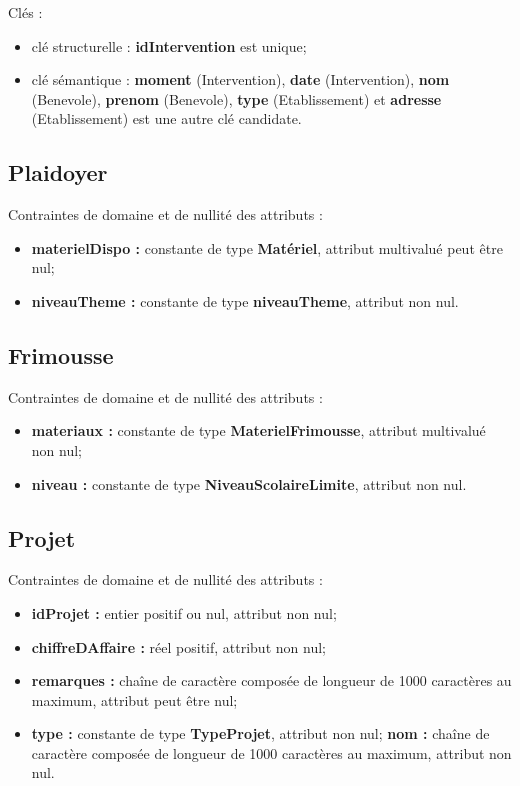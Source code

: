 \documentclass[asi, sansVersion]{picInsa}
\begin{document}
Clés : 
\begin{itemize}
\item clé structurelle : \textbf{idIntervention} est unique;
\item clé sémantique : \textbf{moment} (Intervention), \textbf{date} (Intervention), \textbf{nom} (Benevole), \textbf{prenom} (Benevole), \textbf{type} (Etablissement) et \textbf{adresse} (Etablissement) est une autre clé candidate. \\ 
\end{itemize}

\subsection*{Plaidoyer}
Contraintes de domaine et de nullité des attributs :
\begin{itemize}
	\item \textbf{materielDispo :} constante de type \textbf{Matériel}, attribut multivalué peut être nul; 
	\item \textbf{niveauTheme :} constante de type \textbf{niveauTheme}, attribut non nul.\\
\end{itemize}

\subsection*{Frimousse}
Contraintes de domaine et de nullité des attributs :
\begin{itemize}
	\item \textbf{materiaux :} constante de type \textbf{MaterielFrimousse}, attribut multivalué non nul;
	\item \textbf{niveau :} constante de type \textbf{NiveauScolaireLimite}, attribut non nul.\\
\end{itemize}

\subsection*{Projet}
Contraintes de domaine et de nullité des attributs :
\begin{itemize}
 	\item \textbf{idProjet :} entier positif ou nul, attribut non nul;
	\item \textbf{chiffreDAffaire :} réel positif, attribut non nul;
	\item \textbf{remarques :} chaîne de caractère composée de longueur de 1000 caractères au maximum, attribut peut être nul;
	\item \textbf{type :} constante de type \textbf{TypeProjet}, attribut non nul;
	\textbf{nom :} chaîne de caractère composée de longueur de 1000 caractères au maximum, attribut non nul.\\  
\end{itemize} 
\end{document}
